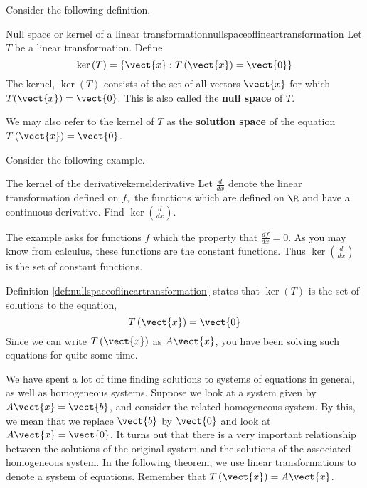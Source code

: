 Consider the following definition.

\begin{definition}{Null space or kernel of a linear transformation}{nullspaceoflineartransformation}
Let $T$ be a linear transformation. Define
\begin{equation*}
\ker \left( T\right) = \left\{ \vect{x}:T \left(\vect{x} \right)= \vect{0} \right\} 
\end{equation*}
The kernel, $\ker \left( T\right) $ consists of the set of all vectors $\vect{x}$ for which
$T (\vect{x}) = \vect{0}$. This is also called the
\textbf{null space} of $T$. 
\end{definition}

We may also refer to the kernel of $T$ as the
\textbf{solution space} of the equation $T \left(\vect{x}\right) = \vect{0}$.


Consider the following example.

\begin{example}{The kernel of the derivative}{kernelderivative}
Let $\frac{d}{dx}$ denote the linear transformation defined on $f,$ the functions
which are defined on $\R$ and have a continuous derivative. Find 
$\ker \left( \frac{d}{dx}\right) .$
\end{example}

\begin{solution} The example asks for functions $f$ which the property that $\frac{df}{dx}
=0. $ As you may know from calculus, these functions are the constant functions.
Thus $\ker \left( \frac{d}{dx}\right)$ is the set of constant functions.
\end{solution} 

Definition \ref{def:nullspaceoflineartransformation} states that $\ker \left( T\right) $ is the set of
solutions to the equation,
\begin{equation*}
T\left( \vect{x} \right) = \vect{0}
\end{equation*}
Since we can write $T\left( \vect{x} \right)$ as $A\vect{x}$, you have been solving such
equations for quite some time.

We have spent a lot of time finding solutions to systems of equations in general, as well as
homogeneous systems. Suppose we look at a system given by $A\vect{x}=\vect{b}$, and consider the 
related homogeneous system. By this, we mean that we replace $\vect{b}$ by $\vect{0}$ and look at $A\vect{x}=\vect{0}$. 
It turns out that there is a very important relationship between the solutions of the original
system and the solutions of the associated homogeneous system. In the following 
theorem, we use linear transformations to denote a system of equations. Remember that
$T\left(\vect{x}\right) = A\vect{x}$.

